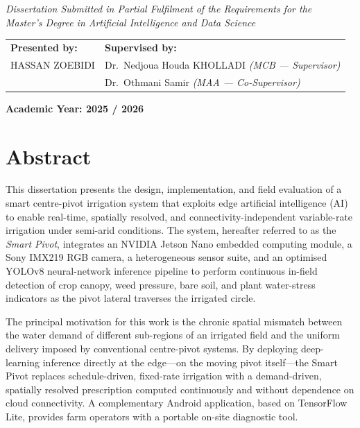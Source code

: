 \documentclass[12pt,a4paper]{report}
\begin{document}
\vspace{0.3cm}

\begin{center}
    \textit{Dissertation Submitted in Partial Fulfilment of the Requirements for the}\\
    \textit{Master's Degree in Artificial Intelligence and Data Science}
\end{center}

\vspace{0.4cm}

\noindent
\begin{tabular}{p{7cm} p{7cm}}
    \textbf{Presented by:} & \textbf{Supervised by:} \\[2pt]
    HASSAN ZOEBIDI & Dr.\ Nedjoua Houda KHOLLADI \hfill
                      \textit{(MCB --- Supervisor)} \\
                  & Dr.\ Othmani Samir \hfill
                      \textit{(MAA --- Co-Supervisor)} \\
\end{tabular}

\vspace{0.5cm}

\begin{center}
    \textbf{\Large Academic Year: 2025 / 2026}
\end{center}

\newpage

\section*{Abstract}

This dissertation presents the design, implementation, and field evaluation of a smart centre-pivot irrigation system that exploits edge artificial intelligence (AI) to enable real-time, spatially resolved, and connectivity-independent variable-rate irrigation under semi-arid conditions. The system, hereafter referred to as the \emph{Smart Pivot}, integrates an NVIDIA Jetson Nano embedded computing module, a Sony IMX219 RGB camera, a heterogeneous sensor suite, and an optimised YOLOv8 neural-network inference pipeline to perform continuous in-field detection of crop canopy, weed pressure, bare soil, and plant water-stress indicators as the pivot lateral traverses the irrigated circle.

The principal motivation for this work is the chronic spatial mismatch between the water demand of different sub-regions of an irrigated field and the uniform delivery imposed by conventional centre-pivot systems. By deploying deep-learning inference directly at the edge---on the moving pivot itself---the Smart Pivot replaces schedule-driven, fixed-rate irrigation with a demand-driven, spatially resolved prescription computed continuously and without dependence on cloud connectivity. A complementary Android application, based on TensorFlow Lite, provides farm operators with a portable on-site diagnostic tool.
\end{document}
